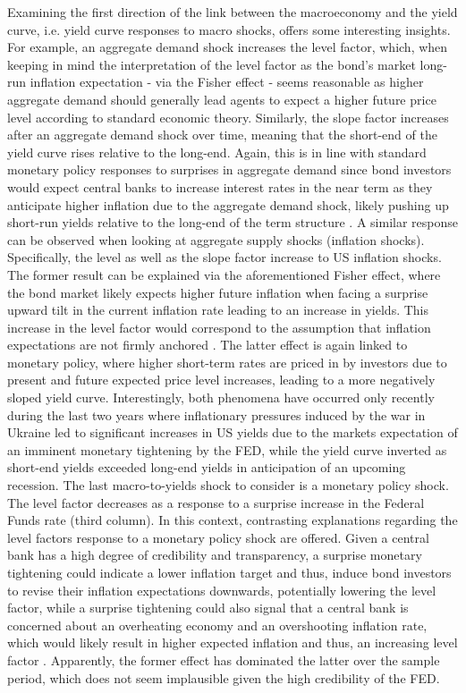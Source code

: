Examining the first direction of the link between the macroeconomy and the yield curve, i.e. yield curve responses to macro shocks, offers some interesting insights. 
For example, an aggregate demand shock increases the level factor, which, when keeping in mind the interpretation 
of the level factor as the bond's market long-run inflation expectation - via the Fisher effect - seems reasonable as higher aggregate demand should generally lead agents to expect a higher future price level according to standard economic theory.  
Similarly, the slope factor increases after an aggregate demand shock over time, meaning that the short-end of the yield curve rises relative to the long-end. 
Again, this is in line with standard monetary policy responses to surprises in aggregate demand since bond investors would expect central banks to increase interest rates in the near term as they anticipate higher inflation due to the aggregate demand shock, likely pushing up short-run yields relative to the long-end of the term structure \citep{diebold2006macroeconomy}.
A similar response can be observed when looking at aggregate supply shocks (inflation shocks).
Specifically, the level as well as the slope factor increase to US inflation shocks.
The former result can be explained via the aforementioned Fisher effect, where the bond market likely expects higher future inflation when facing a surprise upward tilt in the current inflation rate leading to an increase in yields. 
This increase in the level factor would correspond to the assumption that inflation expectations are not firmly anchored \citet{diebold2006macroeconomy}. 
The latter effect is again linked to monetary policy, where higher short-term rates are priced in by investors due to present and future expected price level increases, leading to a more negatively sloped yield curve. 
Interestingly, both phenomena have occurred only recently during the last two years where inflationary pressures induced by the war in Ukraine led to significant increases in US yields due to the markets expectation of an imminent monetary tightening by the FED, while the yield curve inverted as short-end yields exceeded long-end yields in anticipation of an upcoming recession. 
The last macro-to-yields shock to consider is a monetary policy shock. 
The level factor decreases as a response to a surprise increase in the Federal Funds rate (third column). 
In this context, contrasting explanations regarding the level factors response to a monetary policy shock are offered. 
Given a central bank has a high degree of credibility and transparency, a surprise monetary tightening could indicate a lower inflation target and thus, induce bond investors to revise their inflation expectations downwards, potentially lowering the level factor, while a surprise tightening could also signal that a central bank is concerned about an overheating economy and an overshooting inflation rate, which would likely result in higher expected inflation and thus, an increasing level factor \citep{diebold2006macroeconomy}. 
Apparently, the former effect has dominated the latter over the sample period, which does not seem implausible given the high credibility of the FED. 

